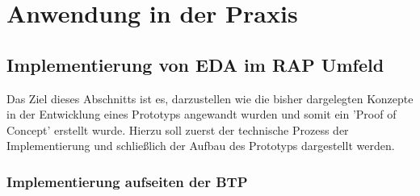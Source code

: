\section{Anwendung in der Praxis}

\subsection{Implementierung von EDA im RAP Umfeld}
\label{implementierung}
  Das Ziel dieses Abschnitts ist es, darzustellen wie die bisher dargelegten Konzepte in der Entwicklung eines Prototyps angewandt wurden und somit ein 'Proof of Concept' erstellt wurde. Hierzu soll zuerst der technische Prozess der Implementierung und schließlich der Aufbau des Prototyps dargestellt werden.\\

  \subsubsection*{Implementierung aufseiten der BTP}
    

